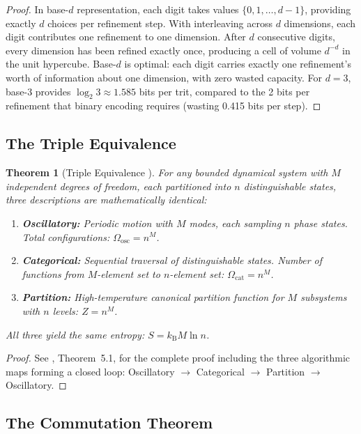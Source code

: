 \documentclass[11pt,twocolumn,a4paper]{article}
\newtheorem{theorem}{Theorem}[section]
\theoremstyle{definition}
\theoremstyle{remark}
\newcommand{\kB}{k_{\mathrm{B}}}
\begin{document}
\begin{proof}
In base-$d$ representation, each digit takes values $\{0, 1, \ldots, d-1\}$, providing exactly $d$ choices per refinement step. With interleaving across $d$ dimensions, each digit contributes one refinement to one dimension. After $d$ consecutive digits, every dimension has been refined exactly once, producing a cell of volume $d^{-d}$ in the unit hypercube. Base-$d$ is optimal: each digit carries exactly one refinement's worth of information about one dimension, with zero wasted capacity. For $d = 3$, base-3 provides $\log_2 3 \approx 1.585$ bits per trit, compared to the 2 bits per refinement that binary encoding requires (wasting 0.415 bits per step).
\end{proof}

\subsection{The Triple Equivalence}

\begin{theorem}[Triple Equivalence {\citep{sachikonye2025b}}]
\label{thm:triple}
For any bounded dynamical system with $M$ independent degrees of freedom, each partitioned into $n$ distinguishable states, three descriptions are mathematically identical:
\begin{enumerate}[nosep]
\item \textbf{Oscillatory:} Periodic motion with $M$ modes, each sampling $n$ phase states. Total configurations: $\Omega_{\mathrm{osc}} = n^M$.
\item \textbf{Categorical:} Sequential traversal of distinguishable states. Number of functions from $M$-element set to $n$-element set: $\Omega_{\mathrm{cat}} = n^M$.
\item \textbf{Partition:} High-temperature canonical partition function for $M$ subsystems with $n$ levels: $Z = n^M$.
\end{enumerate}
All three yield the same entropy: $S = \kB M \ln n$.
\end{theorem}

\begin{proof}
See \citet{sachikonye2025b}, Theorem~5.1, for the complete proof including the three algorithmic maps forming a closed loop: Oscillatory $\to$ Categorical $\to$ Partition $\to$ Oscillatory.
\end{proof}

\subsection{The Commutation Theorem}
\end{document}
